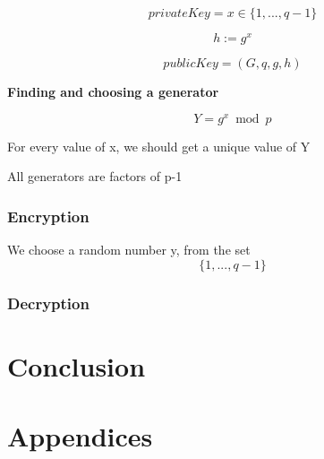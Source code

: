 \documentclass{article}
\begin{document}
\begin{equation}
privateKey = x \in \{1, ..., q-1\}
\end{equation}

\begin{equation}
h := g^{x}
\end{equation}

\begin{equation}
publicKey  = (G, q, g, h)
\end{equation}

\textbf{Finding and choosing a generator}

\begin{equation}
Y = g^{x} \bmod p
\end{equation}

For every value of x, we should get a unique value of Y

All generators are factors of p-1




\subsubsection{Encryption}

We choose a random number y, from the set
\begin{equation}
\{1, ..., q-1\}
\end{equation}


\subsubsection{Decryption}



\section{Conclusion}






\section{Appendices}


\newpage

\nocite{*}



\end{document}
